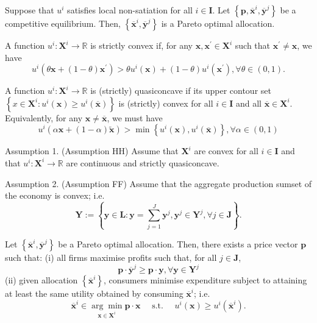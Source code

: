 \documentclass[10pt]{article}
\begin{document}
\begin{theorem}
    Suppose that $u^i$ satisfies local non-satiation for all $i \in \mathbf{I}$. 
    Let $\left\{\mathbf{p}, \overline{\mathbf{x}}^i, \overline{\mathbf{y}}^j\right\}$ 
    be a competitive equilibrium. 
    Then, $\left\{\overline{\mathbf{x}}^i, \overline{\mathbf{y}}^j\right\}$ is a Pareto optimal allocation.
\end{theorem}

\begin{definition}[Convexity] 
    A function $u^i: \mathbf{X}^i \rightarrow \mathbb{R}$ is strictly convex if, for any $\mathbf{x}, \mathbf{x}^{\prime} \in \mathbf{X}^i$ such that $\mathbf{x}^{\prime} \neq \mathbf{x}$, we have
    $$
    u^i\left(\theta \mathbf{x}+(1-\theta) \mathbf{x}^{\prime}\right)>\theta u^i(\mathbf{x})+(1-\theta) u^i\left(\mathbf{x}^{\prime}\right), \forall \theta \in(0,1) .
    $$
\end{definition}

\begin{definition}[Quasiconcavity] 
    A function $u^i: \mathbf{X}^i \rightarrow \mathbb{R}$ is (strictly) quasiconcave if its upper contour set $\left\{x \in \mathbf{X}^i: u^i(\mathbf{x}) \geq u^i(\overline{\mathbf{x}})\right\}$ is (strictly) convex for all $i \in \mathbf{I}$ and all $\overline{\mathbf{x}} \in \mathbf{X}^i$. Equivalently, for any $\mathbf{x} \neq \overline{\mathbf{x}}$, we must have
    $$
    u^i(\alpha \mathbf{x}+(1-\alpha) \tilde{\mathbf{x}})>\min \left\{u^i(\mathbf{x}), u^i(\overline{\mathbf{x}})\right\}, \forall \alpha \in(0,1)
    $$
\end{definition}

\begin{theorem}
    Assumption 1. (Assumption HH) Assume that $\mathbf{X}^i$ are convex for all $i \in \mathbf{I}$ and that $u^i: \mathbf{X}^i \rightarrow \mathbb{R}$ are continuous and strictly quasiconcave.

    Assumption 2. (Assumption FF) Assume that the aggregate production sumset of the economy is convex; i.e.
    $$
    \mathbf{Y}:=\left\{\mathbf{y} \in \mathbf{L}: \mathbf{y}=\sum_{j=1}^J \mathbf{y}^j, \mathbf{y}^j \in \mathbf{Y}^j, \forall j \in \mathbf{J}\right\} .
    $$

    Let $\left\{\overline{\mathbf{x}}^i, \overline{\mathbf{y}}^j\right\}$ be a Pareto optimal allocation. Then, there exists a price vector $\mathbf{p}$ such that:
    (i) all firms maximise profits such that, for all $j \in \mathbf{J}$,
    $$
    \mathbf{p} \cdot \overline{\mathbf{y}}^j \geq \mathbf{p} \cdot \mathbf{y}, \forall \mathbf{y} \in \mathbf{Y}^j
    $$
    (ii) given allocation $\left\{\overline{\mathbf{x}}^i\right\}$, consumers minimise expenditure subject to attaining at least the same utility obtained by consuming $\overline{\mathbf{x}}^i$; i.e.
    $$
    \overline{\mathbf{x}}^i \in \underset{\mathbf{x} \in \mathbf{X}^i}{\arg \min } \mathbf{p} \cdot \mathbf{x} \quad \text { s.t. } \quad u^i(\mathbf{x}) \geq u^i\left(\overline{\mathbf{x}}^i\right) .
    $$
\end{theorem}
\end{document}
